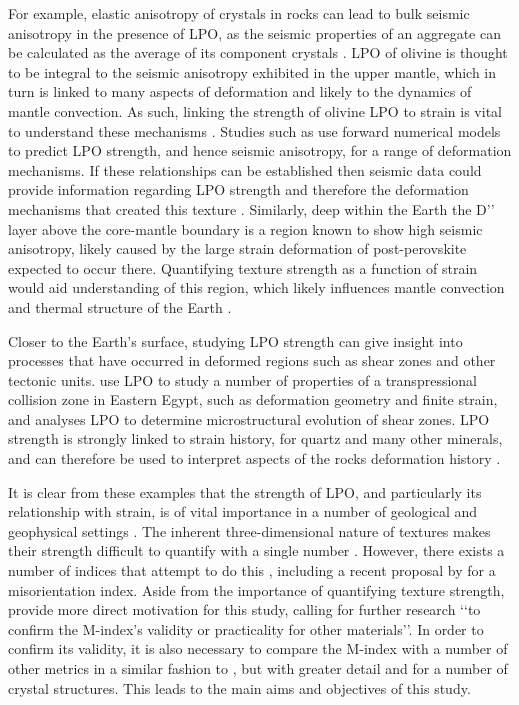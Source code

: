 \documentclass[a4paper,12pt,twoside]{report}
\numberwithin{equation}{chapter}
\begin{document}
For example, elastic anisotropy of crystals in rocks can lead to bulk seismic anisotropy in the presence of LPO, as the seismic properties of an aggregate can be calculated as the average of its component crystals \citep{Tommasi1999}. LPO of olivine is thought to be integral to the seismic anisotropy exhibited in the upper mantle, which in turn is linked to many aspects of deformation and likely to the dynamics of mantle convection. As such, linking the strength of olivine LPO to strain is vital to understand these mechanisms \citep[e.g.][]{Warren2008}. Studies such as \cite{Tommasi2000} use forward numerical models to predict LPO strength, and hence seismic anisotropy, for a range of deformation mechanisms. If these relationships can be established then seismic data could provide information regarding LPO strength and therefore the deformation mechanisms that created this texture \citep[see][for details of a number of other approaches to this problem]{Blackman2002}. Similarly, deep within the Earth the D\rq\rq{} layer \citep{Garnero2008} above the core-mantle boundary is a region known to show high seismic anisotropy, likely caused by the large strain deformation of post-perovskite expected to occur there. Quantifying texture strength as a function of strain would aid understanding of this region, which likely influences mantle convection and thermal structure of the Earth \citep{Miyagi2010}. 

Closer to the Earth's surface, studying LPO strength can give insight into processes that have occurred in deformed regions such as shear zones and other tectonic units. \cite{Unzog2000} use LPO to study a number of properties of a transpressional collision zone in Eastern Egypt, such as deformation geometry and finite strain, and \cite{Lloyd2004} analyses LPO to determine microstructural evolution of shear zones. LPO strength is strongly linked to strain history, for quartz and many other minerals, and can therefore be used to interpret aspects of the rocks deformation history \cite{Price1985}.

It is clear from these examples that the strength of LPO, and particularly its relationship with strain, is of vital importance in a number of geological and geophysical settings \citep[and many more besides, see][for more examples]{Wenk1999}. The inherent three-dimensional nature of textures makes their strength difficult to quantify with a single number \citep{Schaeben2007}. However, there exists a number of indices that attempt to do this \citep[e.g. the texture index][]{bunge1982texture}, including a recent proposal by \cite{Skemer} for a misorientation index. Aside from the importance of quantifying texture strength, \cite{Skemer} provide more direct motivation for this study, calling for further research \lq\lq{}to confirm the M-index's validity or practicality for other materials\rq\rq{}. In order to confirm its validity, it is also necessary to compare the M-index with a number of other metrics in a similar fashion to \cite{Mainprice}, but with greater detail and for a number of crystal structures. This leads to the main aims and objectives of this study.   
   
\end{document}
